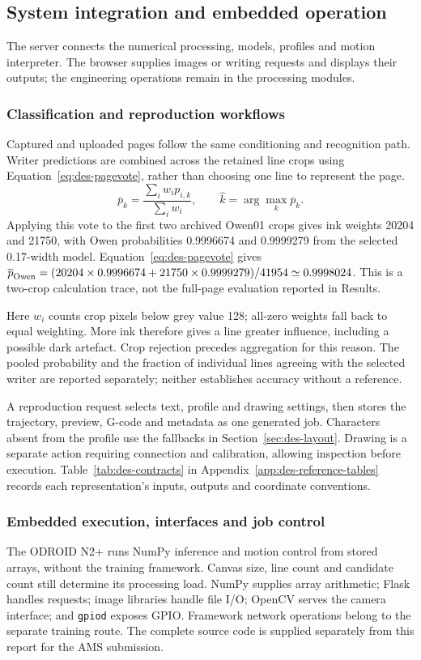 \subsection{System integration and embedded operation}
\label{sec:des-integration}
The server connects the numerical processing, models, profiles and motion interpreter. The browser supplies images or writing requests and displays their outputs; the engineering operations remain in the processing modules.

\subsubsection{Classification and reproduction workflows}
Captured and uploaded pages follow the same conditioning and recognition path. Writer predictions are combined across the retained line crops using Equation~\ref{eq:des-pagevote}, rather than choosing one line to represent the page.
\begin{equation}
\overline p_k=\frac{\sum_i w_i p_{i,k}}{\sum_i w_i},\qquad
\widehat k=\arg\max_k\overline p_k.
\label{eq:des-pagevote}
\end{equation}
Applying this vote to the first two archived Owen01 crops gives ink weights 20204 and 21750, with Owen probabilities 0.9996674 and 0.9999279 from the selected 0.17-width model. Equation~\ref{eq:des-pagevote} gives $\overline p_{\rm Owen}=(20204\times0.9996674+21750\times0.9999279)/41954\simeq0.9998024$. This is a two-crop calculation trace, not the full-page evaluation reported in Results.

Here $w_i$ counts crop pixels below grey value 128; all-zero weights fall back to equal weighting. More ink therefore gives a line greater influence, including a possible dark artefact. Crop rejection precedes aggregation for this reason. The pooled probability and the fraction of individual lines agreeing with the selected writer are reported separately; neither establishes accuracy without a reference.

A reproduction request selects text, profile and drawing settings, then stores the trajectory, preview, G-code and metadata as one generated job. Characters absent from the profile use the fallbacks in Section~\ref{sec:des-layout}. Drawing is a separate action requiring connection and calibration, allowing inspection before execution. Table~\ref{tab:des-contracts} in Appendix~\ref{app:des-reference-tables} records each representation's inputs, outputs and coordinate conventions.

\subsubsection{Embedded execution, interfaces and job control}
The ODROID N2+ runs NumPy inference and motion control from stored arrays, without the training framework. Canvas size, line count and candidate count still determine its processing load. NumPy supplies array arithmetic; Flask handles requests; image libraries handle file I/O; OpenCV serves the camera interface; and \texttt{gpiod} exposes GPIO. Framework network operations belong to the separate training route. The complete source code is supplied separately from this report for the AMS submission.

